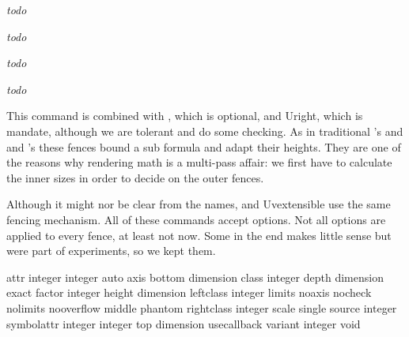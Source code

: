 {\em todo} 

\stopnewprimitive

\startnewprimitive[title={\prm {Udelimiterover}}]

{\em todo} 

\stopnewprimitive

\startnewprimitive[title={\prm {Udelimiterunder}}]

{\em todo} 

\stopnewprimitive

\startnewprimitive[title={\prm {Uhextensible}}]

{\em todo} 

\stopnewprimitive

\startnewprimitive[title={\prm {Uleft}}]

This command is combined with , which is optional, and \prm
{Uright}, which is mandate, although we are tolerant and do some checking. As in
traditional \TEX's  and  and \ETEX's  these
fences bound a sub formula and adapt their heights. They are one of the reasons
why rendering math is a multi-pass affair: we first have to calculate the inner
sizes in order to decide on the outer fences.

Although it might nor be clear from the names,  and \prm
{Uvextensible} use the same fencing mechanism. All of these  commands
accept options. Not all options are applied to every fence, at least not now.
Some in the end makes little sense but were part of experiments, so we kept them.

\starttabulate[|Tl|l|l|]
\NC attr       \NC integer integer \NC \NC \NR
\NC auto       \NC                 \NC \NC \NR
\NC axis       \NC                 \NC \NC \NR
\NC bottom     \NC dimension       \NC \NC \NR
\NC class      \NC integer         \NC \NC \NR
\NC depth      \NC dimension       \NC \NC \NR
\NC exact      \NC                 \NC \NC \NR
\NC factor     \NC integer         \NC \NC \NR
\NC height     \NC dimension       \NC \NC \NR
\NC leftclass  \NC integer         \NC \NC \NR
\NC limits     \NC                 \NC \NC \NR
\NC noaxis     \NC                 \NC \NC \NR
\NC nocheck    \NC                 \NC \NC \NR
\NC nolimits   \NC                 \NC \NC \NR
\NC nooverflow \NC                 \NC \NC \NR
\NC middle     \NC                 \NC \NC \NR
\NC phantom    \NC                 \NC \NC \NR
\NC rightclass \NC integer         \NC \NC \NR
\NC scale      \NC                 \NC \NC \NR
\NC single     \NC                 \NC \NC \NR
\NC source     \NC integer         \NC \NC \NR
\NC symbolattr \NC integer integer \NC \NC \NR
\NC top        \NC dimension       \NC \NC \NR
\NC usecallback\NC                 \NC \NC \NR
\NC variant    \NC integer         \NC \NC \NR
\NC void       \NC                 \NC \NC \NR
\stoptabulate

